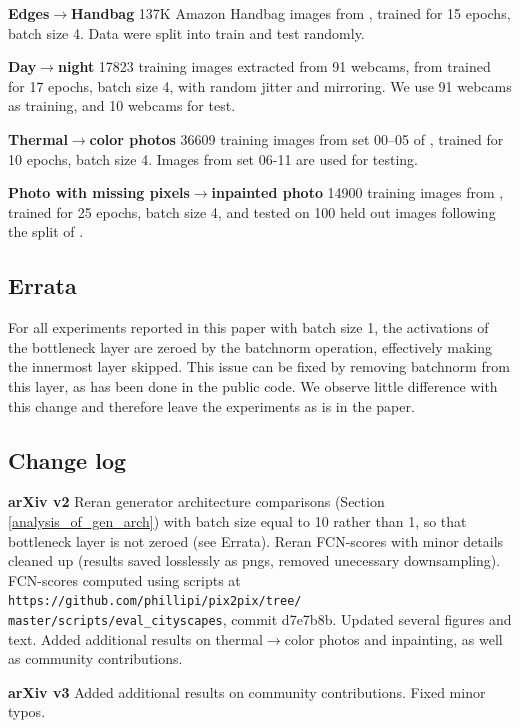\documentclass[10pt,twocolumn,letterpaper]{article}
\begin{document}
{\bf Edges$\rightarrow$Handbag} 137K Amazon Handbag images from \cite{zhu2016generative}, trained for 15 epochs, batch size 4. Data were split into train and test randomly.

{\bf Day$\rightarrow$night} 17823 training images extracted from 91 webcams, from \cite{laffont2014transient} trained for 17 epochs, batch size 4, with random jitter and mirroring. We use 91 webcams as training, and 10 webcams for test.

{\bf Thermal$\rightarrow$color photos} 36609 training images from set 00--05 of \cite{hwang2015multispectral}, trained for 10 epochs, batch size 4. Images from set 06-11 are used for testing.

{\bf Photo with missing pixels$\rightarrow$inpainted photo} 14900 training images from \cite{doersch2012makes}, trained for 25 epochs, batch size 4, and tested on 100 held out images following the split of \cite{pathak2016context}.

\subsection{Errata}
For all experiments reported in this paper with batch size 1, the activations of the bottleneck layer are zeroed by the batchnorm operation, effectively making the innermost layer skipped. This issue can be fixed by removing batchnorm from this layer, as has been done in the public code. We observe little difference with this change and therefore leave the experiments as is in the paper.

\subsection{Change log}
{\bf arXiv v2} Reran generator architecture comparisons (Section \ref{analysis_of_gen_arch}) with batch size equal to 10 rather than 1, so that bottleneck layer is not zeroed (see Errata). Reran FCN-scores with minor details cleaned up (results saved losslessly as pngs, removed unecessary downsampling). FCN-scores computed using scripts at \texttt{https://github.com/phillipi/pix2pix/tree/\\master/scripts/eval\_cityscapes}, commit d7e7b8b. Updated several figures and text. Added additional results on thermal$\rightarrow$color photos and inpainting, as well as community contributions.

{\bf arXiv v3} Added additional results on community contributions. Fixed minor typos.
\end{document}
